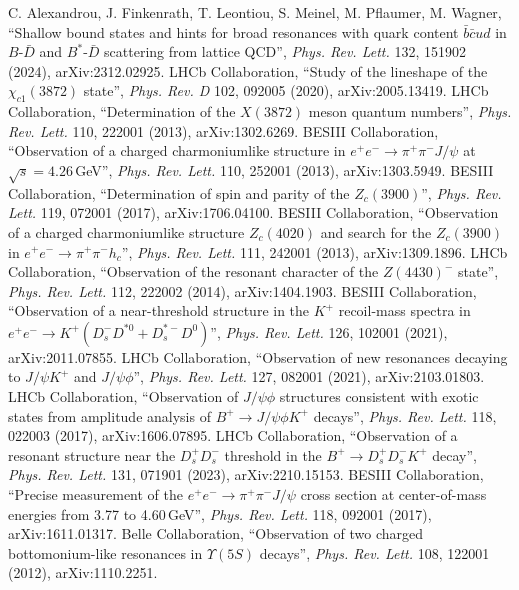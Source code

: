  C. Alexandrou, J. Finkenrath, T. Leontiou, S. Meinel, M. Pflaumer, M. Wagner, ``Shallow bound states and hints
for broad resonances with quark content $\bar b\bar cud$ in $B$-$\bar D$ and $B^*$-$\bar D$ scattering from lattice QCD'', \emph{Phys.
Rev. Lett.} 132, 151902 (2024), arXiv:2312.02925.
 LHCb Collaboration, ``Study of the lineshape of the $\chi_{c1}(3872)$ state'', \emph{Phys. Rev. D} 102, 092005 (2020),
arXiv:2005.13419.
 LHCb Collaboration, ``Determination of the $X(3872)$ meson quantum numbers'', \emph{Phys. Rev. Lett.} 110, 222001
(2013), arXiv:1302.6269.
 BESIII Collaboration, ``Observation of a charged charmoniumlike structure in $e^+e^-\to\pi^+\pi^-J/\psi$ at
$\sqrt s=4.26$\,GeV'', \emph{Phys. Rev. Lett.} 110, 252001 (2013), arXiv:1303.5949.
 BESIII Collaboration, ``Determination of spin and parity of the $Z_c(3900)$'', \emph{Phys. Rev. Lett.} 119, 072001
(2017), arXiv:1706.04100.
 BESIII Collaboration, ``Observation of a charged charmoniumlike structure $Z_c(4020)$ and search for the
$Z_c(3900)$ in $e^+e^-\to\pi^+\pi^-h_c$'', \emph{Phys. Rev. Lett.} 111, 242001 (2013), arXiv:1309.1896.
 LHCb Collaboration, ``Observation of the resonant character of the $Z(4430)^-$ state'', \emph{Phys. Rev. Lett.} 112,
222002 (2014), arXiv:1404.1903.
 BESIII Collaboration, ``Observation of a near-threshold structure in the $K^+$ recoil-mass spectra in
$e^+e^-\to K^+(D_s^-D^{*0}+D_s^{*-}D^0)$'', \emph{Phys. Rev. Lett.} 126, 102001 (2021), arXiv:2011.07855.
 LHCb Collaboration, ``Observation of new resonances decaying to $J/\psi K^+$ and $J/\psi\phi$'', \emph{Phys. Rev. Lett.}
127, 082001 (2021), arXiv:2103.01803.
 LHCb Collaboration, ``Observation of $J/\psi\phi$ structures consistent with exotic states from amplitude analysis of
$B^+\to J/\psi\phi K^+$ decays'', \emph{Phys. Rev. Lett.} 118, 022003 (2017), arXiv:1606.07895.
 LHCb Collaboration, ``Observation of a resonant structure near the $D_s^+D_s^-$ threshold in the
$B^+\to D_s^+D_s^-K^+$ decay'', \emph{Phys. Rev. Lett.} 131, 071901 (2023), arXiv:2210.15153.
 BESIII Collaboration, ``Precise measurement of the $e^+e^-\to\pi^+\pi^-J/\psi$ cross section at center-of-mass
energies from 3.77 to 4.60\,GeV'', \emph{Phys. Rev. Lett.} 118, 092001 (2017), arXiv:1611.01317.
 Belle Collaboration, ``Observation of two charged bottomonium-like resonances in $\Upsilon(5S)$ decays'', \emph{Phys. Rev.
Lett.} 108, 122001 (2012), arXiv:1110.2251.
